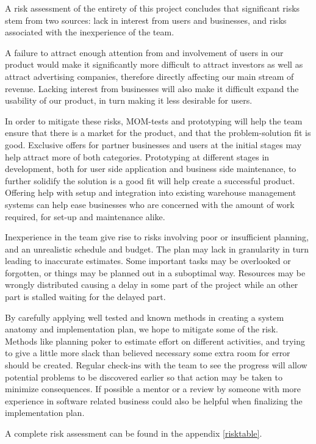\documentclass[titlepage]{article}
\begin{document}
A risk assessment of the entirety of this project concludes that significant risks stem from two sources: lack in interest from users and businesses, and risks associated with the inexperience of the team.

A failure to attract enough attention from and involvement of users in our product would make it significantly more difficult to attract investors as well as attract advertising companies, therefore directly affecting our main stream of revenue. Lacking interest from businesses will also make it difficult expand the usability of our product, in turn making it less desirable for users.

In order to mitigate these risks, MOM-tests and prototyping will help the team ensure that there is a market for the product, and that the problem-solution fit is good. Exclusive offers for partner businesses and users at the initial stages may help attract more of both categories. Prototyping at different stages in development, both for user side application and business side maintenance, to further solidify the solution is a good fit will help create a successful product. Offering help with setup and integration into existing warehouse management systems can help ease businesses who are concerned with the amount of work required, for set-up and maintenance alike. 

Inexperience in the team give rise to risks involving poor or insufficient planning, and an unrealistic schedule and budget. The plan may lack in granularity in turn leading to inaccurate estimates. Some important tasks may be overlooked or forgotten, or things may be planned out in a suboptimal way. Resources may be wrongly distributed causing a delay in some part of the project while an other part is stalled waiting for the delayed part.

By carefully applying well tested and known methods in creating a system anatomy and implementation plan, we hope to mitigate some of the risk. Methods like planning poker to estimate effort on different activities, and trying to give a little more slack than believed necessary some extra room for error should be created. Regular check-ins with the team to see the progress will allow potential problems to be discovered earlier so that action may be taken to minimize consequences. If possible a mentor or a review by someone with more experience in software related business could also be helpful when finalizing the implementation plan.

A complete risk assessment can be found in the appendix \ref{risktable}.
\end{document}
